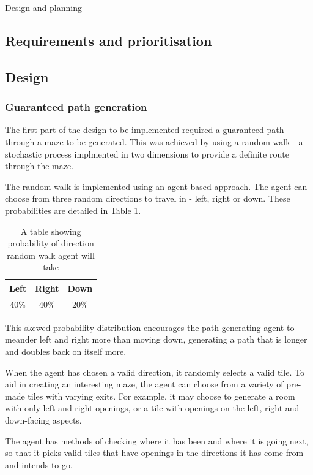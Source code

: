 \documentclass[progress]{cmpreport}
\begin{document}
\begin{section}{Design and planning}
\subsection{Requirements and prioritisation}

\subsection{Design}
\subsubsection{Guaranteed path generation}
The first part of the design to be implemented required a guaranteed path through a maze to be generated. This was achieved by using a random walk - a stochastic process implmented in two dimensions to provide a definite route through the maze.

The random walk is implemented using an agent based approach. The agent can choose from three random directions to travel in - left, right or down. These probabilities are detailed in Table \ref{tab:probdirs}.

\begin{table}[h!]
    \centering
    \begin{tabular}{ |c|c|c| }
    \hline
    Left & Right & Down \\ 
    \hline
    40\% & 40\% & 20\%\\ 
    \hline
    \end{tabular}
    \caption{A table showing probability of direction random walk agent will take}
    \label{tab:probdirs}
    \end{table}

This skewed probability distribution encourages the path generating agent to meander left and right more than moving down, generating a path that is longer and doubles back on itself more.



\end{section}

When the agent has chosen a valid direction, it randomly selects a valid tile. To aid in creating an interesting maze, the agent can choose from a variety of pre-made tiles with varying exits. For example, it may choose to generate a room with only left and right openings, or a tile with openings on the left, right and down-facing aspects. 

The agent has methods of checking where it has been and where it is going next, so that it picks valid tiles that have openings in the directions it has come from and intends to go.
\end{document}
